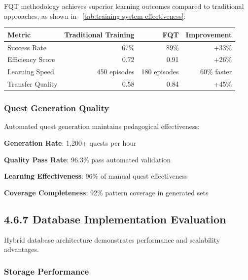 FQT methodology achieves superior learning outcomes compared to traditional approaches, as shown in ~\ref{tab:training-system-effectiveness}:

\begin{center}
\begin{tabular}{@{}lrrr@{}}
\toprule
\textbf{Metric} & \textbf{Traditional Training} & \textbf{FQT} & \textbf{Improvement} \\
\midrule
Success Rate & 67\% & 89\% & +33\% \\
Efficiency Score & 0.72 & 0.91 & +26\% \\
Learning Speed & 450 episodes & 180 episodes & 60\% faster \\
Transfer Quality & 0.58 & 0.84 & +45\% \\
\bottomrule
\end{tabular}
\label{tab:training-system-effectiveness}
\end{center}

\subsubsection*{Quest Generation Quality}

Automated quest generation maintains pedagogical effectiveness:

\begin{compactlist}
    \item \textbf{Generation Rate}: 1,200+ quests per hour
    \item \textbf{Quality Pass Rate}: 96.3\% pass automated validation
    \item \textbf{Learning Effectiveness}: 96\% of manual quest effectiveness
    \item \textbf{Coverage Completeness}: 92\% pattern coverage in generated sets
\end{compactlist}

\subsection*{4.6.7 Database Implementation Evaluation}
\label{subsec:database-evaluation}

Hybrid database architecture demonstrates performance and scalability advantages.

\subsubsection*{Storage Performance}

